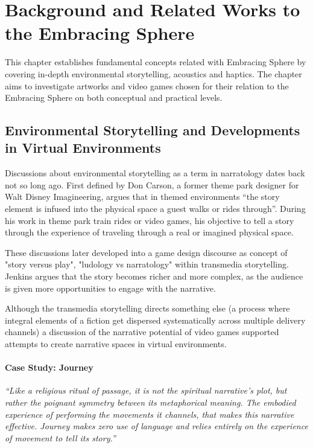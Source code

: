 \chapter{Background and Related Works to the Embracing Sphere}
    This chapter establishes fundamental concepts related with Embracing Sphere by covering in-depth environmental storytelling, acoustics and haptics. The chapter aims to investigate artworks and video games chosen for their relation to the Embracing Sphere on both conceptual and practical levels.\par
    \section{Environmental Storytelling and Developments in Virtual Environments}
        Discussions about environmental storytelling as a term in narratology dates back not so long ago. First defined by Don Carson, a former theme park designer for Walt Disney Imagineering, argues that in themed environments “the story element is infused into the physical space a guest walks or rides through”\cite{Liminal_Space_Between_Embedded_and_Emergent_Narrative}. During his work in theme park train rides or video games, his objective to tell a story through the experience of traveling through a real or imagined physical space\cite{Lessons_Learned_from_the_Theme_Park_Industry}.\par

        These discussions later developed into a game design discourse as concept of "story versus play", "ludology vs narratology\cite{Hamlet_on_the_Holodeck}" within transmedia storytelling\cite{Jenkins_Shall_We_Play}. Jenkins argues that the story becomes richer and more complex, as the audience is given more opportunities to engage with the narrative.\par

        Although the transmedia storytelling directs something else (a process where integral elements of a fiction get dispersed systematically across multiple delivery channels\cite{Jenkins_Transmedia}) a discussion of the narrative potential of video games supported attempts to create narrative spaces in virtual environments\cite{Liminal_Space_Between_Embedded_and_Emergent_Narrative}.\par

        \subsubsection{Case Study: Journey}
            \emph{“Like a religious ritual of passage, it is not the spiritual narrative’s plot, but rather the poignant symmetry between its metaphorical meaning. The embodied experience of performing the movements it channels, that makes this narrative effective. Journey makes zero use of language and relies entirely on the experience of movement to tell its story\cite{Game_Movement_as_Enactive_Focalization}\cite{Narrative_Geography}.”}\par


